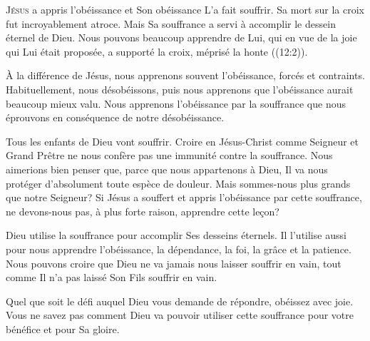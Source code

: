 
\lettrine{J}{ésus} a appris l'obéissance et Son obéissance
 L'a fait souffrir.
 Sa mort sur la croix fut incroyablement atroce.
 Mais Sa souffrance a servi à accomplir le dessein éternel de Dieu.
 Nous pouvons beaucoup apprendre de Lui,
 \Og qui 
 en vue de la joie qui Lui était proposée, a supporté la croix,
 méprisé la honte \Fg{} ((12:2)). 

À la différence de Jésus, nous apprenons souvent l'obéissance,
 forcés et contraints. Habituellement, nous désobéissons,
 puis nous apprenons que l'obéissance aurait beaucoup mieux valu.
 Nous apprenons l'obéissance par la souffrance que nous éprouvons
 en conséquence de notre désobéissance. 


Tous les enfants de Dieu vont souffrir.
 Croire en Jésus-Christ comme Seigneur et Grand Prêtre ne nous confère pas
 une immunité contre la souffrance. Nous aimerions bien penser que,
 parce que nous appartenons à Dieu, Il va nous protéger d'absolument
 toute espèce de douleur.
 Mais sommes-nous plus grands que notre Seigneur?
 Si Jésus a souffert et appris l'obéissance par cette souffrance,
 ne devons-nous pas, à plus forte raison, apprendre cette le\c{c}on? 

Dieu utilise la souffrance pour accomplir Ses desseins éternels.
 Il l'utilise aussi pour nous apprendre l'obéissance, la dépendance,
 la foi, la grâce et la patience.
 Nous pouvons croire que Dieu ne va jamais nous laisser souffrir en vain,
 tout comme Il n'a pas laissé Son Fils souffrir en vain. 

Quel que soit le défi auquel Dieu vous demande de répondre,
 obéissez avec joie. Vous ne savez pas comment Dieu va pouvoir utiliser
 cette souffrance pour votre bénéfice et pour Sa gloire. 

\dvrule






